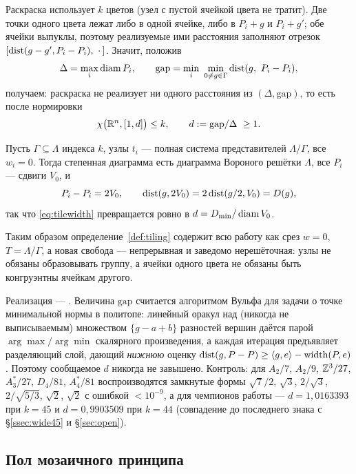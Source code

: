 Раскраска использует $k$ цветов (узел с пустой ячейкой цвета не тратит). Две
точки одного цвета лежат либо в одной ячейке, либо в $P_i+g$ и $P_i+g'$; обе
ячейки выпуклы, поэтому реализуемые ими расстояния заполняют отрезок
$[\operatorname{dist}(g-g',P_i-P_i),\ \cdot\,]$. Значит, положив
\[
\Delta=\max_i\operatorname{diam} P_i,\qquad
\mathrm{gap}=\min_i\ \min_{0\ne g\in\Gamma}\operatorname{dist}(g,\ P_i-P_i),
\]
получаем: раскраска не реализует ни одного расстояния из $(\Delta,\mathrm{gap})$,
то есть после нормировки
\begin{equation}\label{eq:tilewidth}
\chi\bigl(\mathbb{R}^n,[1,d]\bigr)\le k,\qquad d:=\mathrm{gap}/\Delta\ \ge 1 .
\end{equation}

\begin{proposition}\label{prop:contains}
Пусть $\Gamma\subseteq\Lambda$ индекса $k$, узлы $t_i$ --- полная система
представителей $\Lambda/\Gamma$, все $w_i=0$. Тогда степенная диаграмма есть
диаграмма Вороного решётки $\Lambda$, все $P_i$ --- сдвиги $V_0$, и
\[
P_i-P_i=2V_0,\qquad \operatorname{dist}(g,2V_0)=2\operatorname{dist}(g/2,V_0)=D(g),
\]
так что \eqref{eq:tilewidth} превращается ровно в $d=D_{\min}/\operatorname{diam} V_0$.
\end{proposition}

Таким образом определение~\ref{def:tiling} содержит всю работу как срез
$w=0$, $T=\Lambda/\Gamma$, а новая свобода --- непрерывная и заведомо
нерешёточная: узлы не обязаны образовывать группу, а ячейки одного цвета не
обязаны быть конгруэнтны ячейкам другого.

Реализация ---
. Величина
$\mathrm{gap}$
считается алгоритмом Вульфа для задачи о точке минимальной нормы в политопе: линейный
оракул над (никогда не выписываемым) множеством $\{g-a+b\}$ разностей вершин
даётся парой $\arg\max/\arg\min$ скалярного произведения, а каждая итерация
предъявляет разделяющий слой, дающий \emph{нижнюю} оценку
$\operatorname{dist}(g,P-P)\ge\langle g,e\rangle-\operatorname{width}(P,e)$. Поэтому
сообщаемое $d$ никогда не завышено. Контроль: для
$A_2/7$, $A_2/9$, $\mathbb{Z}^3/27$, $A_3^*/27$, $D_4/81$, $A_4^*/81$ воспроизводятся
замкнутые формы $\sqrt7/2$, $\sqrt3$, $2/\sqrt3$, $2/\sqrt{5/3}$, $\sqrt2$,
$\sqrt2$ с ошибкой $<10^{-9}$, а для чемпионов работы --- $d=1{,}0163393$ при
$k=45$ и $d=0{,}9903509$ при $k=44$ (совпадение до последнего знака с
\S\ref{ssec:wide45} и \S\ref{sec:open}).

\subsection{Пол мозаичного принципа}
\label{ssec:floor}

